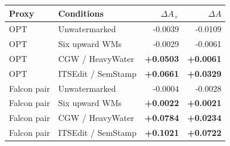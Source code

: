 \begin{tabular}{llrr}
\toprule
Proxy & Conditions & $\Delta A_+$ & $\Delta A$ \\
\midrule
OPT & Unwatermarked & -0.0039 & -0.0109 \\
OPT & Six upward WMs & -0.0029 & -0.0061 \\
OPT & CGW / HeavyWater & \textbf{+0.0503} & \textbf{+0.0061} \\
OPT & ITSEdit / SemStamp & \textbf{+0.0661} & \textbf{+0.0329} \\
Falcon pair & Unwatermarked & -0.0004 & -0.0028 \\
Falcon pair & Six upward WMs & \textbf{+0.0022} & \textbf{+0.0021} \\
Falcon pair & CGW / HeavyWater & \textbf{+0.0784} & \textbf{+0.0234} \\
Falcon pair & ITSEdit / SemStamp & \textbf{+0.1021} & \textbf{+0.0722} \\
\bottomrule
\end{tabular}
